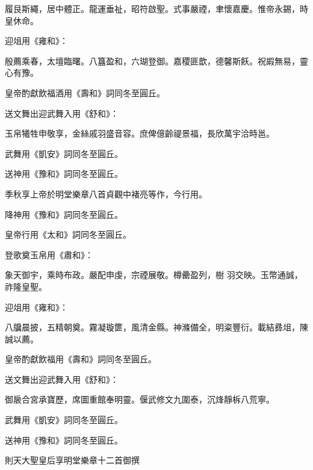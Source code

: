 \begin{pinyinscope}
 履艮斯繩，居中體正。龍運垂祉，昭符啟聖。式事嚴禋，聿懷嘉慶。惟帝永錫，時皇休命。



 迎俎用《雍和》：



 殷薦乘春，太壇臨曙。八簋盈和，六瑚登御。嘉稷匪歆，德馨斯飫。祝嘏無易，靈心有豫。



 皇帝酌獻飲福酒用《壽和》詞同冬至圓丘。



 送文舞出迎武舞入用《舒和》：



 玉帛犧牲申敬享，金絲戚羽盛音容。庶俾億齡禔景福，長欣萬宇洽時邕。



 武舞用《凱安》詞同冬至圓丘。



 送神用《豫和》詞同冬至圓丘。



 季秋享上帝於明堂樂章八首貞觀中褚亮等作，今行用。



 降神用《豫和》詞同冬至圓丘。



 皇帝行用《太和》詞同冬至圓丘。



 登歌奠玉帛用《肅和》：



 象天御宇，乘時布政。嚴配申虔，宗禋展敬。樽罍盈列，樹
 羽交映。玉幣通誠，祚隆皇聖。



 迎俎用《雍和》：



 八牖晨披，五精朝奠。霧凝璇篚，風清金縣。神滌備全，明粢豐衍。載結彞俎，陳誠以薦。



 皇帝酌獻飲福用《壽和》詞同冬至圓丘。



 送文舞出迎武舞入用《舒和》：



 御扆合宮承寶歷，席圖重館奉明靈。偃武修文九圍泰，沉烽靜柝八荒寧。



 武舞用《凱安》詞同冬至圓丘。



 送神用《豫和》詞同冬至圓丘。



 則天大聖皇后享明堂樂章十二首御撰




\end{pinyinscope}
